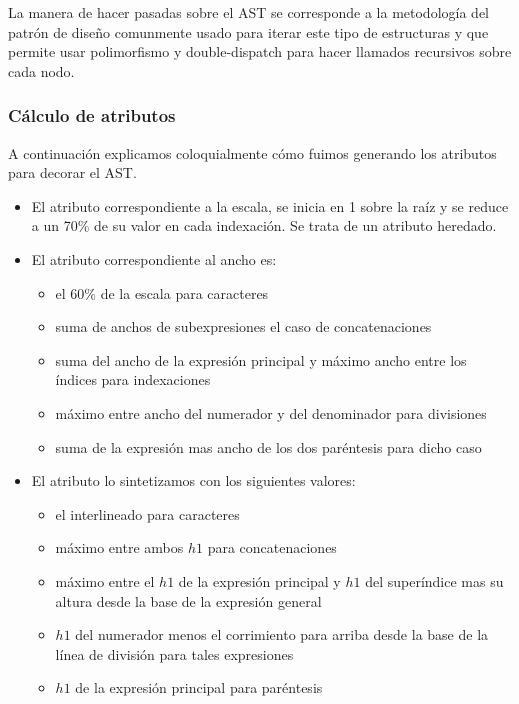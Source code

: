 La manera de hacer pasadas sobre el AST se corresponde a la metodología del patrón de diseño  comunmente usado para iterar este tipo de estructuras y que permite usar polimorfismo y double-dispatch para hacer llamados recursivos sobre cada nodo.

\subsubsection{Cálculo de atributos}
A continuación explicamos coloquialmente cómo fuimos generando los atributos para decorar el AST.

\begin{itemize}
	\item El atributo \textbf{} correspondiente a la escala, se inicia en 1 sobre la raíz y se reduce a un 70\% de su valor en cada indexación. Se trata de un atributo heredado.

	\item El atributo \textbf{} correspondiente al ancho es:
	\begin{itemize}
		\item el 60\% de la escala para caracteres
		\item suma de anchos de subexpresiones el caso de concatenaciones
		\item suma del ancho de la expresión principal y máximo ancho entre los índices para indexaciones
		\item máximo entre ancho del numerador y del denominador para divisiones
		\item suma de la expresión mas ancho de los dos paréntesis para dicho caso
	\end{itemize}

	\item El atributo \textbf{} lo sintetizamos con los siguientes valores:
	\begin{itemize}
		\item el interlineado para caracteres
		\item máximo entre ambos $h1$ para concatenaciones
		\item máximo entre el $h1$ de la expresión principal y $h1$ del superíndice mas su altura desde la base de la expresión general
		\item $h1$ del numerador menos el corrimiento para arriba desde la base de la línea de división para tales expresiones
		\item $h1$ de la expresión principal para paréntesis
	\end{itemize}


\end{itemize}
